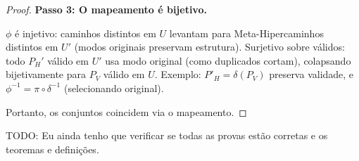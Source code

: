 \documentclass{article}
\begin{document}
\begin{proof}
\textbf{Passo 3: O mapeamento é bijetivo.}

\( \phi \) é injetivo: caminhos distintos em \( U \) levantam para Meta-Hipercaminhos distintos em \( U' \) (modos originais preservam estrutura). Surjetivo sobre válidos: todo \( P_H' \) válido em \( U' \) usa modo original (como duplicados cortam), colapsando bijetivamente para \( P_V \) válido em \( U \). Exemplo: \( P'_H = \delta(P_V) \) preserva validade, e \( \phi^{-1} = \pi \circ \delta^{-1} \) (selecionando original).

Portanto, os conjuntos coincidem via o mapeamento.
\end{proof}
\bigskip

TODO: Eu ainda tenho que verificar se todas as provas estão corretas e os teoremas e definições.
\end{document}
